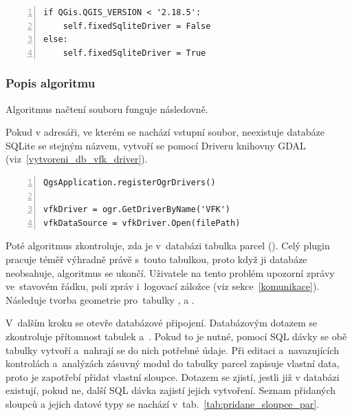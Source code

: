 {\scriptsize
\begin{lstlisting}[style=python, caption={Kontrola verze programu QGIS}, captionpos=b, label=kontrola_verze_qgis, backgroundcolor = \color{light-gray},  numbers=left]
if QGis.QGIS_VERSION < '2.18.5':
    self.fixedSqliteDriver = False
else:
    self.fixedSqliteDriver = True
\end{lstlisting}}

\subsubsection{Popis algoritmu}
\label{popis_algoritmu_nacteni_vfk}

Algoritmus načtení  souboru funguje následovně.

Pokud v adresáři, ve kterém se nachází vstupní  soubor, neexistuje databáze SQLite se stejným názvem, vytvoří se pomocí  Driveru knihovny GDAL (viz~\ref{vytvoreni_db_vfk_driver}).

{\scriptsize
\begin{lstlisting}[style=python, caption={Vytvoření SQLite databáze pomocí VFK Driveru}, captionpos=b, label=vytvoreni_db_vfk_driver, backgroundcolor = \color{light-gray},  numbers=left]
QgsApplication.registerOgrDrivers()

vfkDriver = ogr.GetDriverByName('VFK')
vfkDataSource = vfkDriver.Open(filePath)
\end{lstlisting}}

Poté algoritmus zkontroluje, zda je v~databázi tabulka parcel (). Celý plugin pracuje téměř výhradně právě s~touto tabulkou, proto když ji databáze neobsahuje, algoritmus se ukončí. Uživatele na tento problém upozorní zprávy ve~stavovém řádku, poli zpráv i~logovací záložce (viz sekce~\ref{komunikace}). Následuje tvorba geometrie pro~tabulky ,  a .

V~dalším kroku se otevře databázové připojení. Databázovým dotazem se zkontroluje přítomnost tabulek \textit{} a~\textit{}. Pokud to je nutné, pomocí SQL dávky se obě tabulky vytvoří a~nahrají se do nich potřebné údaje. Při editaci a~navazujících kontrolách a~analýzách zásuvný modul do tabulky parcel zapisuje vlastní data, proto je zapotřebí přidat vlastní sloupce. Dotazem se zjistí, jestli již v databázi existují, pokud ne, další SQL dávka zajistí jejich vytvoření. Seznam přidaných sloupců a jejich datové typy se nachází v~tab.~\ref{tab:pridane_sloupce_par}.

